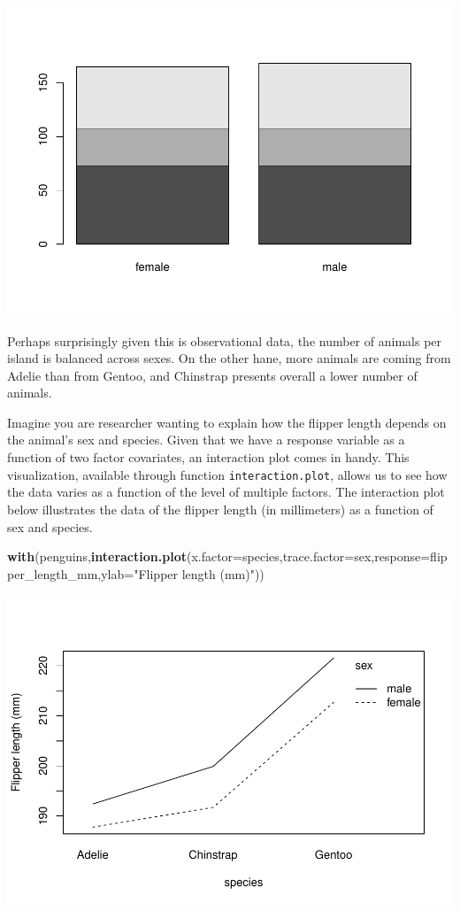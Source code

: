 \documentclass[
]{book}
\newenvironment{Shaded}{\begin{snugshade}}{\end{snugshade}}
\newcommand{\AttributeTok}[1]{\textcolor[rgb]{0.13,0.29,0.53}{#1}}
\newcommand{\FunctionTok}[1]{\textcolor[rgb]{0.13,0.29,0.53}{\textbf{#1}}}
\newcommand{\NormalTok}[1]{#1}
\newcommand{\StringTok}[1]{\textcolor[rgb]{0.31,0.60,0.02}{#1}}
\begin{document}
\includegraphics{ECOMODbook_files/figure-latex/a8.38-1.pdf}

Perhaps surprisingly given this is observational data, the number of animals per island is balanced across sexes. On the other hane, more animals are coming from Adelie than from Gentoo, and Chinstrap presents overall a lower number of animals.

Imagine you are researcher wanting to explain how the flipper length depends on the animal's sex and species. Given that we have a response variable as a function of two factor covariates, an interaction plot comes in handy. This visualization, available through function \texttt{interaction.plot}, allows us to see how the data varies as a function of the level of multiple factors. The interaction plot below illustrates the data of the flipper length (in millimeters) as a function of sex and species.

\begin{Shaded}
\begin{Highlighting}[]
\FunctionTok{with}\NormalTok{(penguins,}\FunctionTok{interaction.plot}\NormalTok{(}\AttributeTok{x.factor=}\NormalTok{species,}\AttributeTok{trace.factor=}\NormalTok{sex,}\AttributeTok{response=}\NormalTok{flipper\_length\_mm,}\AttributeTok{ylab=}\StringTok{"Flipper length (mm)"}\NormalTok{))}
\end{Highlighting}
\end{Shaded}

\includegraphics{ECOMODbook_files/figure-latex/a8.39-1.pdf}
\end{document}
